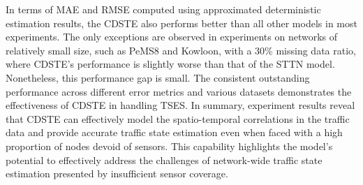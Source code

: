\documentclass[a4paper,fleqn,12pt]{cas-sc}
\newcommand{\rev}[1]{{\color{red} #1}}
\begin{document}
In terms of MAE and RMSE computed using approximated deterministic estimation results, the CDSTE also performs better than all other models \rev{in most experiments. The only exceptions are observed in experiments on networks of relatively small size, such as PeMS8 and Kowloon, with a 30\% missing data ratio, where CDSTE's performance is slightly worse than that of the STTN model. Nonetheless, this performance gap is small.} The consistent outstanding performance across different error metrics and various datasets demonstrates the effectiveness of CDSTE in handling TSES. In summary, experiment results reveal that CDSTE can effectively model the spatio-temporal correlations in the traffic data and provide accurate traffic state estimation even when faced with a high proportion of nodes devoid of sensors. This capability highlights the model's potential to effectively address the challenges of network-wide traffic state estimation presented by insufficient sensor coverage.
\end{document}
